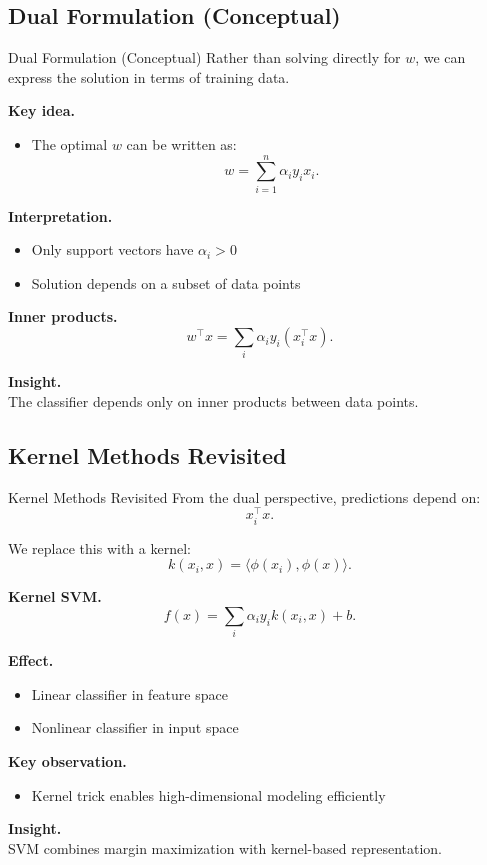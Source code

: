 \documentclass[aspectratio=169,11pt]{beamer}
\begin{document}
\subsection{Dual Formulation (Conceptual)}
\begin{frame}[t,allowframebreaks]{Dual Formulation (Conceptual)}
\small
Rather than solving directly for $w$, we can express the solution in terms of training data.

\textbf{Key idea.}\\ \begin{itemize}
    \item The optimal $w$ can be written as:
    \[
    w = \sum_{i=1}^n \alpha_i y_i x_i.
    \]
\end{itemize}

\textbf{Interpretation.}\\ \begin{itemize}
    \item Only support vectors have $\alpha_i > 0$
    \item Solution depends on a subset of data points
\end{itemize}

\textbf{Inner products.}\\ \[
w^\top x = \sum_i \alpha_i y_i (x_i^\top x).
\]

\textbf{Insight.}\\ The classifier depends only on inner products between data points.
\end{frame}

\subsection{Kernel Methods Revisited}
\begin{frame}[t,allowframebreaks]{Kernel Methods Revisited}
\small
From the dual perspective, predictions depend on:
\[
x_i^\top x.
\]

We replace this with a kernel:
\[
k(x_i, x) = \langle \phi(x_i), \phi(x) \rangle.
\]

\textbf{Kernel SVM.}\\ \[
f(x) = \sum_i \alpha_i y_i k(x_i, x) + b.
\]

\textbf{Effect.}\\ \begin{itemize}
    \item Linear classifier in feature space
    \item Nonlinear classifier in input space
\end{itemize}

\textbf{Key observation.}\\ \begin{itemize}
    \item Kernel trick enables high-dimensional modeling efficiently
\end{itemize}

\textbf{Insight.}\\ SVM combines margin maximization with kernel-based representation.
\end{frame}
\end{document}
